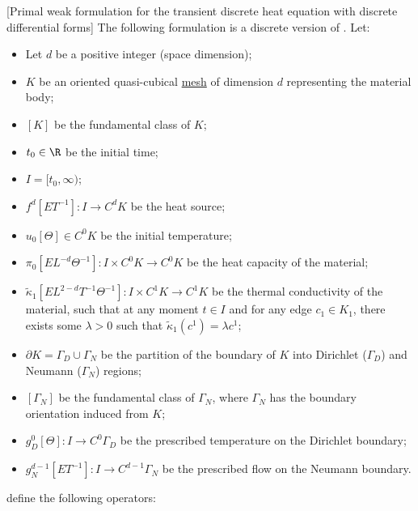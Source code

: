 \begin{formulation}
  \label{idec/diffusion/discrete/transient/primal_weak-formulation}
  [Primal weak formulation for the transient discrete heat equation
    with discrete differential forms]
  The following formulation is a discrete version of
  .
  Let:
  \begin{itemize}
    \item
      Let $d$ be a positive integer (space dimension);
    \item
      $K$ be an oriented quasi-cubical \hyperref[idec:mesh:definition]{mesh} of
      dimension $d$ representing the material body;
    \item
      $[K]$ be the fundamental class of $K$;
    \item
      $t_0 \in \R$ be the initial time;
    \item
      $I = [t_0, \infty)$;
    \item
      $f^d [E T^{-1}] \colon I \to C^d K$ be the heat source;
    \item
      $u_0 [\Theta] \in C^0 K$ be the initial temperature;
    \item
      $\pi_0 [E L^{-d} \Theta^{-1}] \colon I \times C^0 K \to C^0 K$
      be the heat capacity of the material;
    \item
      $\tilde{\kappa}_1 [E L^{2 - d} T^{-1} \Theta^{-1}]
      \colon I \times C^1 K \to C^1 K$
      be the thermal conductivity of the material, such that at any moment
      $t \in I$ and for any edge $c_1 \in K_1$, there exists some $\lambda > 0$
      such that $\tilde{\kappa}_1(c^1) = \lambda c^1$;
    \item
      $\partial K = \Gamma_D \cup \Gamma_N$ be the partition of the boundary of
      $K$ into Dirichlet ($\Gamma_D$) and Neumann ($\Gamma_N$) regions;
    \item
      $[\Gamma_N]$ be the fundamental class of $\Gamma_N$, where $\Gamma_N$
      has the boundary orientation induced from $K$;
    \item
      $g_D^0 [\Theta] \colon I \to C^0 \Gamma_D$
      be the prescribed temperature on the Dirichlet boundary;
    \item
      $g_N^{d - 1} [E T^{-1}] \colon I \to C^{d - 1} \Gamma_N$
      be the prescribed flow on the Neumann boundary.
  \end{itemize}
  define the following operators:
  \begin{subequations}
    \begin{alignat}{3}

\end{alignat}
\end{subequations}
\end{formulation}
